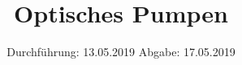 

\subject{VERSUCH NUMMER 21}
\title{Optisches Pumpen}
\date{
  Durchführung: 13.05.2019
  \hspace{3em}
  Abgabe: 17.05.2019
}



\thispagestyle{empty}
\maketitle
\thispagestyle{empty}
\tableofcontents
\newpage
\setcounter{page}{1}


% 




\nocite{*}
\printbibliography


